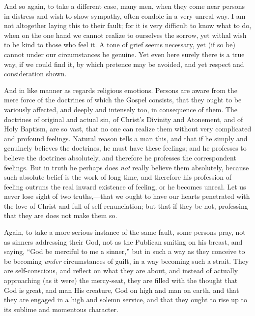 And so again, to take a different case, many men, when they come
near persons in distress and wish to show sympathy, often condole in a
very unreal way. I am not altogether laying this to their fault; for
it is very difficult to know what to do, when on the one hand we
cannot realize to ourselves the sorrow, yet withal wish to be kind to
those who feel it. A tone of grief seems necessary, yet (if so be)
cannot under our circumstances be genuine. Yet even here surely there
is a true way, if we could find it, by which pretence may be avoided,
and yet respect and consideration shown.

And in like manner as regards religious emotions. Persons are aware
from the mere force of the doctrines of which the Gospel consists,
that they ought to be variously affected, and deeply and intensely
too, in consequence of them. The doctrines of original and actual sin,
of Christ's Divinity and Atonement, and of Holy Baptism, are so vast,
that no one can realize them without very complicated and profound
feelings. Natural reason tells a man this, and that if he simply and
genuinely believes the doctrines, he must have these feelings; and he
professes to believe the doctrines absolutely, and therefore he
professes the correspondent feelings. But in truth he perhaps does
\emph{not}
really believe them absolutely, because such absolute belief is the
work of long time, and therefore his profession of feeling outruns the
real inward existence of feeling, or he becomes unreal. Let us never
lose sight of two truths,—that we ought to have our hearts
penetrated with the love of Christ and full of self-renunciation; but
that if they be not, professing that they are does not make them so.

Again, to take a more serious instance of the same fault, some
persons pray, not as sinners addressing their God, not as the Publican
smiting on his breast, and saying, ``God be merciful to me a
sinner,'' but in such a way as they conceive to be becoming \emph{under}
circumstances of guilt, in a way becoming such a strait. They are
self-conscious, and reflect on what they are about, and instead of
actually approaching (as it were) the mercy-seat, they are filled with
the thought that God is great, and man His creature, God on high and
man on earth, and that they are engaged in a high and solemn service,
and that they ought to rise up to its sublime and momentous character.

